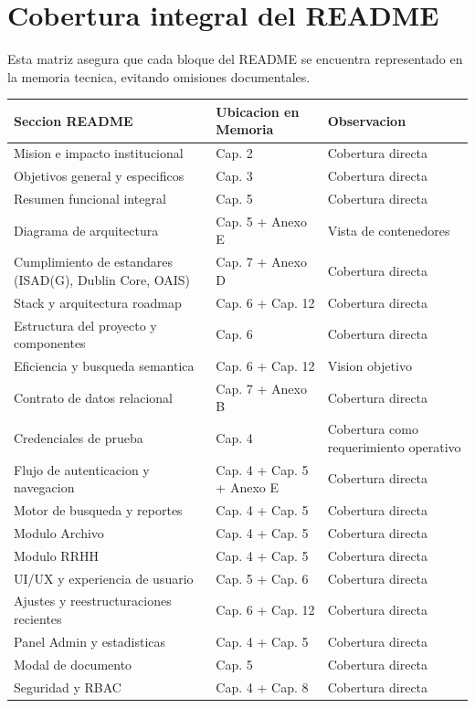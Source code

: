 \section{Cobertura integral del README}
Esta matriz asegura que cada bloque del README se encuentra representado en la memoria tecnica, evitando omisiones documentales.

\begin{longtable}{p{} p{} p{}}
\toprule
\textbf{Seccion README} & \textbf{Ubicacion en Memoria} & \textbf{Observacion} \\
\midrule
Mision e impacto institucional & Cap. 2 & Cobertura directa \\
Objetivos general y especificos & Cap. 3 & Cobertura directa \\
Resumen funcional integral & Cap. 5 & Cobertura directa \\
Diagrama de arquitectura & Cap. 5 + Anexo E & Vista de contenedores \\
Cumplimiento de estandares (ISAD(G), Dublin Core, OAIS) & Cap. 7 + Anexo D & Cobertura directa \\
Stack y arquitectura roadmap & Cap. 6 + Cap. 12 & Cobertura directa \\
Estructura del proyecto y componentes & Cap. 6 & Cobertura directa \\
Eficiencia y busqueda semantica & Cap. 6 + Cap. 12 & Vision objetivo \\
Contrato de datos relacional & Cap. 7 + Anexo B & Cobertura directa \\
Credenciales de prueba & Cap. 4 & Cobertura como requerimiento operativo \\
Flujo de autenticacion y navegacion & Cap. 4 + Cap. 5 + Anexo E & Cobertura directa \\
Motor de busqueda y reportes & Cap. 4 + Cap. 5 & Cobertura directa \\
Modulo Archivo & Cap. 4 + Cap. 5 & Cobertura directa \\
Modulo RRHH & Cap. 4 + Cap. 5 & Cobertura directa \\
UI/UX y experiencia de usuario & Cap. 5 + Cap. 6 & Cobertura directa \\
Ajustes y reestructuraciones recientes & Cap. 6 + Cap. 12 & Cobertura directa \\
Panel Admin y estadisticas & Cap. 4 + Cap. 5 & Cobertura directa \\
Modal de documento & Cap. 5 & Cobertura directa \\
Seguridad y RBAC & Cap. 4 + Cap. 8 & Cobertura directa \\

\end{longtable}
